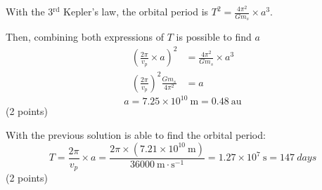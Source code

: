 \begin{description}
With the 3$^{\mathrm{rd}}$ Kepler's law, the orbital period is
$T^2 = \frac{4\pi^2}{Gm_s}\times a^3$.

Then, combining both expressions of $T$ is possible to find $a$
\begin{align*}
\left(\frac{2\pi}{v_p}\times a\right)^{2} &= \frac{4\pi^2}{Gm_s}\times a^3\\
\left(\frac{2\pi}{v_p}\right)^{2}\frac{Gm_s}{4\pi^2} &= a
\end{align*}
\[ a = 7.25\times10^{10}\ \mathrm{m} = 0.48\ \mathrm{au} \]
\hfill(2 points)

With the previous solution is able to find the orbital period:
\[ T = \frac{2\pi}{v_p}\times a
     = \frac{2\pi\times(7.21\times10^{10}\ \mathrm{m})}{36000\ \mathrm{m\cdot s^{-1}}}
     = 1.27\times10^{7}\ \mathrm{s} = 147\ days \]
\hfill(2 points)
\end{description}
